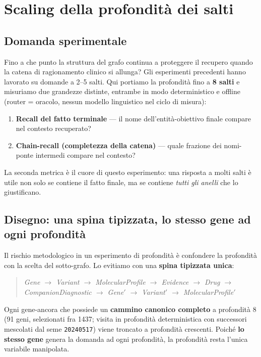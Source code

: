 \documentclass[11pt,a4paper]{report}
\begin{document}
\chapter*{Scaling della profondità dei salti}

\section*{Domanda sperimentale}

Fino a che punto la struttura del grafo continua a proteggere il recupero quando la catena
di ragionamento clinico si allunga? Gli esperimenti precedenti hanno lavorato su domande a
2--5 salti. Qui portiamo la profondità fino a \textbf{8 salti} e misuriamo due grandezze
distinte, entrambe in modo deterministico e offline (router = oracolo, nessun modello
linguistico nel ciclo di misura):

\begin{enumerate}
  \item \textbf{Recall del fatto terminale} --- il nome dell'entità-obiettivo finale compare
        nel contesto recuperato?
  \item \textbf{Chain-recall (completezza della catena)} --- quale frazione dei nomi-ponte
        intermedi compare nel contesto?
\end{enumerate}

La seconda metrica è il cuore di questo esperimento: una risposta a molti salti è utile non
solo se contiene il fatto finale, ma se contiene \emph{tutti gli anelli} che lo giustificano.

\section*{Disegno: una spina tipizzata, lo stesso gene ad ogni profondità}

Il rischio metodologico in un esperimento di profondità è confondere la profondità con la
scelta del sotto-grafo. Lo evitiamo con una \textbf{spina tipizzata unica}:

\begin{quote}\itshape
Gene $\rightarrow$ Variant $\rightarrow$ MolecularProfile $\rightarrow$ Evidence
$\rightarrow$ Drug $\rightarrow$ CompanionDiagnostic $\rightarrow$ Gene$'$
$\rightarrow$ Variant$'$ $\rightarrow$ MolecularProfile$'$
\end{quote}

Ogni gene-ancora che possiede un \textbf{cammino canonico completo} a profondità 8
(\num{91} geni, selezionati fra \num{1437}; visita in profondità deterministica con
successori mescolati dal seme \texttt{20240517}) viene troncato a profondità crescenti.
Poiché \textbf{lo stesso gene} genera la domanda ad ogni profondità, la profondità resta
l'unica variabile manipolata.
\end{document}
